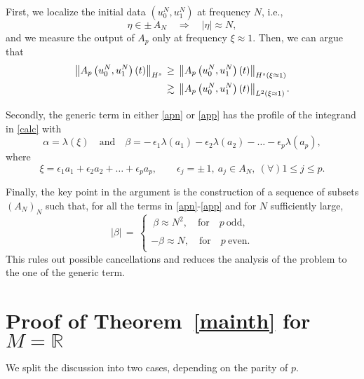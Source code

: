 \documentclass{amsart}
\newcommand{\R}{\mathbb{R}}
\begin{document}
First, we localize the initial data $(u^N_0,u^N_1)$ at frequency $N$, i.e.,
\[
\eta\in \pm \,A_N\quad \Longrightarrow \quad |\eta| \approx N,\]
and we measure the output of $A_p$ only at frequency $\xi \approx 1$. Then, we can argue that
\begin{equation}
\aligned
\left\|A_{p}\left(u_0^N,u_1^N\right)(t)\right\|_{H^s}\,&\geq\, \left\|A_{p}\left(u_0^N,u_1^N\right)(t)\right\|_{H^{s}(\xi \approx 1)}\\
&\gtrsim\, \left\|A_{p}\left(u_0^N,u_1^N\right)(t)\right\|_{L^2(\xi \approx 1)}.
\endaligned
\label{aphs}
\end{equation}

Secondly, the generic term in either \eqref{apn} or \eqref{app} has the profile of the integrand in \eqref{calc} with
\begin{equation}
\alpha=\lambda(\xi) \quad \text{and} \quad \beta= -\,\epsilon_1\lambda(a_1)-\epsilon_2\lambda(a_2)-\ldots-\epsilon_p\lambda(a_p),
\label{ab}
\end{equation}
where
\begin{equation}
\xi=  \epsilon_1 a_1+\epsilon_2 a_2+ \ldots+\epsilon_p a_p, \qquad \epsilon_j=\pm \,1, \ a_j\in A_N, \ (\forall)1\leq j\leq p.\label{xi}
\end{equation}

Finally, the key point in the argument is the construction of a sequence of subsets $(A_N)_N$ such that, for all the terms in \eqref{apn}-\eqref{app} and for $N$ sufficiently large,
\begin{equation}
 |\beta|\,=\, \left\{
\begin{array}{l}
\ \beta \approx N^{2}, \quad \text{for} \quad p \ \text{odd},\\
\\
-\beta \approx N, \quad \text{for} \quad p \ \text{even}.\\
\end{array}\right.
\end{equation}
This rules out possible cancellations and reduces the analysis of the problem to the one of the generic term.

\section{Proof of Theorem~\ref{mainth} for $M=\R$}

We split the discussion into two cases, depending on the parity of $p$.
\end{document}

